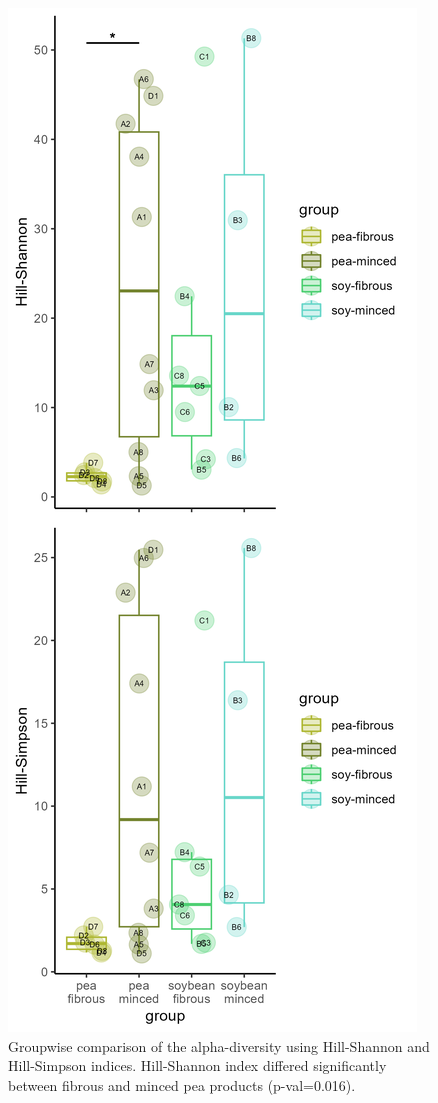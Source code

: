 \documentclass[preprint,3p,
a4paper]{elsarticle} %
\begin{document}
\begin{figure}

{\centering \includegraphics[width=0.5\linewidth]{PlotDivByCov} 

}

\caption{\label{figSM1} Groupwise comparison of the alpha-diversity using Hill-Shannon and Hill-Simpson indices. Hill-Shannon index differed significantly between fibrous and minced pea products (p-val=0.016).}\label{fig:figSM1}
\end{figure}
\end{document}
